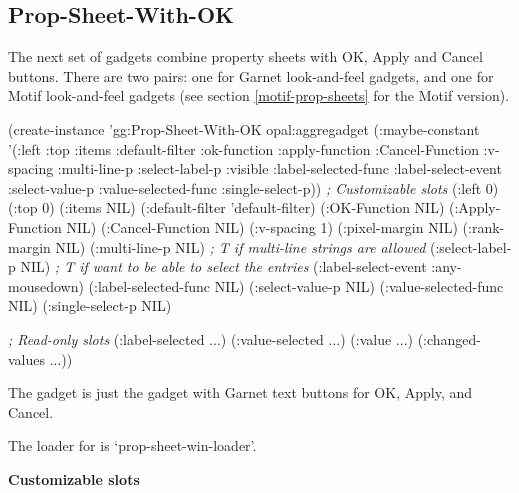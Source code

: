 \begin{group}
\subsection{Prop-Sheet-With-OK}
\label{propsheetwithok}

The next set of gadgets combine property sheets with OK, Apply and
Cancel buttons.  There are two pairs: one for Garnet look-and-feel
gadgets, and one for Motif look-and-feel gadgets (see section
\ref{motif-prop-sheets} for the Motif version).

\begin{programexample}
(create-instance 'gg:Prop-Sheet-With-OK opal:aggregadget
    (:maybe-constant '(:left :top :items :default-filter :ok-function
		       :apply-function :Cancel-Function :v-spacing
		       :multi-line-p :select-label-p  :visible
		       :label-selected-func :label-select-event
		       :select-value-p :value-selected-func :single-select-p))
   {\it ; Customizable slots}
    (:left 0) (:top 0)
    (:items NIL)
    (:default-filter 'default-filter)
    (:OK-Function NIL)
    (:Apply-Function NIL)
    (:Cancel-Function NIL)
    (:v-spacing 1)
    (:pixel-margin NIL)
    (:rank-margin NIL)
    (:multi-line-p NIL) {\it ; T if multi-line strings are allowed}
    (:select-label-p NIL) {\it ; T if want to be able to select the entries}
    (:label-select-event :any-mousedown)
    (:label-selected-func NIL)
    (:select-value-p NIL)
    (:value-selected-func NIL)
    (:single-select-p NIL)

   {\it ; Read-only slots}
    (:label-selected ...)
    (:value-selected ...)
    (:value ...)
    (:changed-values ...))
\end{programexample}
\end{group}

The  gadget is just the  gadget
with Garnet text buttons for OK, Apply, and Cancel.

The loader for  is `prop-sheet-win-loader'.

{\bf Customizable slots}

